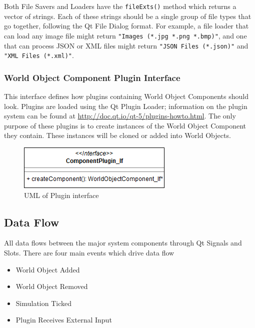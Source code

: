  Both File Savers and Loaders have the \lstinline|fileExts()| method which returns a vector of strings. Each of these strings should be a single group of file types that go together, following the Qt File Dialog format. For example, a file loader that can load any image file might return \lstinline|"Images (*.jpg *.png *.bmp)"|, and one that can process JSON or XML files might return \lstinline|"JSON Files (*.json)"| and \lstinline|"XML Files (*.xml)"|.

  \subsubsection*{World Object Component Plugin Interface}
  This interface defines how plugins containing World Object Components should look. Plugins are loaded using the Qt Plugin Loader; information on the plugin system can be found at \href{http://doc.qt.io/qt-5/plugins-howto.html#the-low-level-api-extending-qt-applications}{http://doc.qt.io/qt-5/plugins-howto.html}. 
  The only purpose of these plugins is to create instances of the World Object Component they contain. These instances will be cloned or added into World Objects.
 \begin{figure}[h]
 	\begin{center}
 	\includegraphics[scale=0.5]{./images_design/uml/ComponentPlugin}
 	\caption{UML of Plugin interface\label{uml:componentplugin}}
 	\end{center}
 \end{figure} 
 
 \subsection{Data Flow}
 All data flows between the major system components through Qt Signals and Slots. There are four main events which drive data flow
 \begin{itemize}
 	\item World Object Added
 	\item World Object Removed
 	\item Simulation Ticked
 	\item Plugin Receives External Input
 \end{itemize}
 
